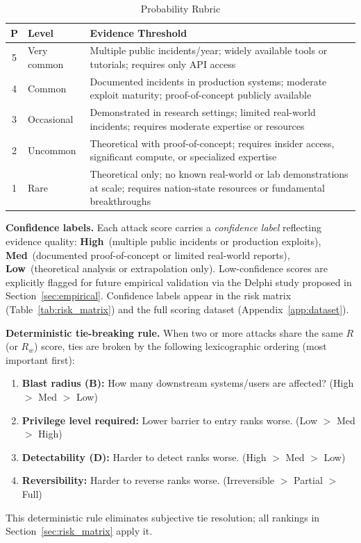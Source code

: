 \documentclass[conference]{IEEEtran}
\newcommand{\tableheaderrow}{\rowcolor{accentblue}}
\renewcommand{\thead}[1]{\textbf{\color{white}\sffamily #1}}
\begin{document}
\begin{table}[!htbp]
\centering
\caption{Probability Rubric}
\label{tab:prob_rubric}
\renewcommand{\arraystretch}{1.2}
\scriptsize\sffamily
\begin{tabular}{cp{2.2cm}p{4.1cm}}
\toprule
\tableheaderrow \thead{P} & \thead{Level} & \thead{Evidence Threshold} \\
\toprule
\rowcolor{rowalt} 5 & Very common & Multiple public incidents/year; widely available tools or tutorials; requires only API access \\
4 & Common & Documented incidents in production systems; moderate exploit maturity; proof-of-concept publicly available \\
\rowcolor{rowalt} 3 & Occasional & Demonstrated in research settings; limited real-world incidents; requires moderate expertise or resources \\
2 & Uncommon & Theoretical with proof-of-concept; requires insider access, significant compute, or specialized expertise \\
\rowcolor{rowalt} 1 & Rare & Theoretical only; no known real-world or lab demonstrations at scale; requires nation-state resources or fundamental breakthroughs \\
\bottomrule
\end{tabular}
\end{table}

\textbf{Confidence labels.} Each attack score carries a \emph{confidence label} reflecting evidence quality: \textbf{High}~(multiple public incidents or production exploits), \textbf{Med}~(documented proof-of-concept or limited real-world reports), \textbf{Low}~(theoretical analysis or extrapolation only). Low-confidence scores are explicitly flagged for future empirical validation via the Delphi study proposed in Section~\ref{sec:empirical}. Confidence labels appear in the risk matrix (Table~\ref{tab:risk_matrix}) and the full scoring dataset (Appendix~\ref{app:dataset}).

\textbf{Deterministic tie-breaking rule.} When two or more attacks share the same $R$ (or $R_w$) score, ties are broken by the following lexicographic ordering (most important first):
\begin{enumerate}[leftmargin=*, nosep]
  \item \textbf{Blast radius (B):} How many downstream systems/users are affected? (High $>$ Med $>$ Low)
  \item \textbf{Privilege level required:} Lower barrier to entry ranks worse. (Low $>$ Med $>$ High)
  \item \textbf{Detectability (D):} Harder to detect ranks worse. (High $>$ Med $>$ Low)
  \item \textbf{Reversibility:} Harder to reverse ranks worse. (Irreversible $>$ Partial $>$ Full)
\end{enumerate}
This deterministic rule eliminates subjective tie resolution; all rankings in Section~\ref{sec:risk_matrix} apply it.
\end{document}
